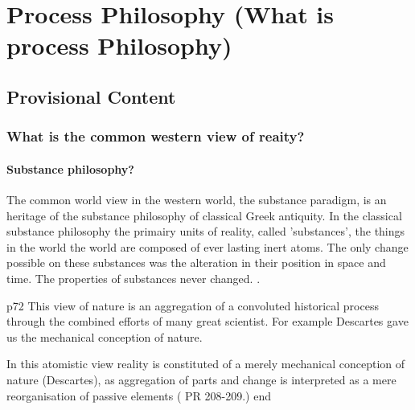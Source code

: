 
\chapter{Process Philosophy (What is process Philosophy)}




\section{Provisional Content}

\subsection{What is the common western view of reaity?}

\subsubsection{Substance philosophy?}
The common world view in the western world, the substance paradigm, is an heritage of the substance philosophy of classical Greek antiquity.
In the classical substance philosophy the primairy units of reality, called 'substances', the things in the world the world are composed of ever lasting inert atoms. The only change possible on these substances was the alteration in their position in space and time. The properties of substances never changed.
\cite{rescher1996process,seibt-2013-sep,rescher-2012-sep}.


\cite[ch 5]{rapp1990whitehad}
p72
This view of nature is an aggregation of a convoluted historical process through the combined efforts of many great scientist. For example Descartes gave us the mechanical conception of nature.

In this atomistic view reality is constituted of a merely mechanical conception of nature (Descartes), as  aggregation of parts and change is interpreted as a mere reorganisation of passive elements ( PR 208-209.)
end




